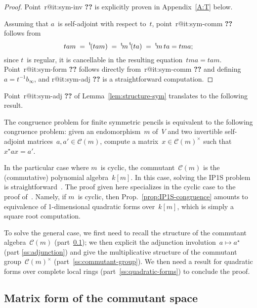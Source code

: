 \documentclass{article}%
\makeatletter
\newif\ifapx \apxtrue %
\def\labelenumi{(\roman{enumi})}
\def\itemref#1{\expandafter\ifx\csname r@#1\endcsname\relax
  {\bfseries ??}\else{\setcounter{enumi}{\ref{#1}}\labelenumi}\fi}
\let\ro\mathscr
\def\transpose#1{{\vphantom{#1}}^{\mathrm{t}}\!#1}
\makeatother
\begin{document}
\begin{proof}
\ifapx
Point~\itemref{it:sym-inv} is explicitly proven in Appendix~\ref{A:T}
below.
\fi
Assuming that $a$~is self-adjoint with respect to~$t$,
point~\itemref{it:sym-comm} follows from
\begin{equation}
tam \;=\;
\transpose{(tam)} \;=\; \transpose{m}\, \transpose{(ta)}
 \;=\; \transpose{m}\,ta = tma;
\end{equation}
since $t$~is regular, it is cancellable in the resulting equation~$tma
= tam$. Point~\itemref{it:sym-form} follows directly
from~\itemref{it:sym-comm} and defining~$a = t^{-1} b_{∞}$,
and \itemref{it:sym-adj} is a straightforward computation.
\end{proof}

Point~\itemref{it:sym-adj} of Lemma~\ref{lem:structure-sym} translates to the
following result.

\begin{prop}\label{prop:IP1S-congruence}
The congruence problem for finite symmetric pencils is equivalent to the
following congruence problem: given an endomorphism~$m$ of~$V$ and two
invertible self-adjoint matrices~$a, a' ∈ \ro C(m)$, compute a matrix~$x
∈ \ro C(m)^{×}$ such that~$x^{⋆} a x = a'$.
\end{prop}

In the particular case where $m$~is cyclic, the commutant~$\ro C(m)$ is
the (commutative) polynomial algebra~$k[m]$. In this case, solving the
IP1S problem is straightforward~\cite{MPG2013}. The proof given here
specializes in the cyclic case to the proof of~\cite{MPG2013}. Namely, if
$m$~is cyclic, then Prop.~\ref{prop:IP1S-congruence} amounts to
equivalence of 1-dimensional quadratic forms over~$k[m]$, which is simply
a square root computation.

To solve the general case, we first need to recall the structure of the
commutant algebra~$\ro C(m)$ (part~\ref{ss:commutant-space}); we then
explicit the adjunction involution~$a ↦ a^{⋆}$ (part \ref{ss:adjunction})
and give the multiplicative structure of the commutant group~$\ro
C(m)^{×}$ (part~\ref{ss:commutant-group}). We then need a result for
quadratic forms over complete local rings (part~\ref{ss:quadratic-forms})
to conclude the proof.

\subsection{Matrix form of the commutant space}%
\label{ss:commutant-space}
\end{document}
